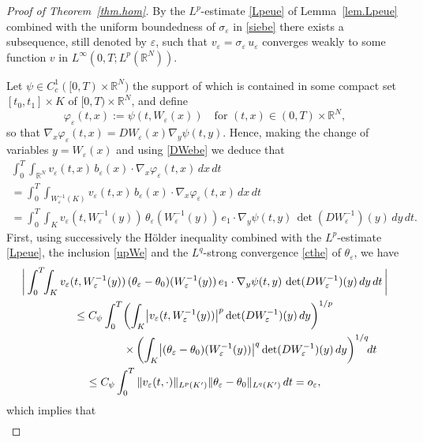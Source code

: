 \documentclass[JEP,XML,SOM,Unicode]{cedram}
\let \ph \varphi
\def \RR {\mathbb R}
\theoremstyle{plain}
\theoremstyle{definition}
\begin{document}
\begin{proof}[Proof of Theorem~\ref{thm.hom}]
By the $L^p$-estimate \eqref{Lpeue} of Lemma~\ref{lem.Lpeue} combined with the uniform boundedness of $\sigma_\varepsilon$ in \eqref{siebe} there exists a subsequence, still denoted by $\varepsilon$, such that $v_\varepsilon=\sigma_\varepsilon\,u_\varepsilon$ converges weakly to some function $v$ in $L^\infty(0,T;L^p(\RR^N))$.

Let $\psi\in C^1_c([0,T)\times\RR^N)$ the support of which is contained in some compact set $[t_0,t_1]\times K$ of $[0,T)\times\RR^N$, and define
\begin{equation}\label{phe}
\ph_\varepsilon(t,x):=\psi(t, W_\varepsilon(x))\quad\mbox{for }(t,x)\in(0,T)\times\RR^N,
\end{equation}
so that $\nabla_x\ph_\varepsilon(t,x)=DW_\varepsilon(x)\nabla_y\psi(t,y)$.
Hence, making the change of variables $y=W_\varepsilon(x)$ and using \eqref{DWebe} we deduce that
\begin{multline}\label{vebe}
\int_0^T\!\!\int_{\RR^N}v_\varepsilon(t,x)\,b_\varepsilon(x)\cdot\nabla_x\ph_\varepsilon(t,x)\,dx\,dt\\
=\int_0^T\!\!\int_{W_\varepsilon^{-1}(K)}v_\varepsilon(t,x)\,b_\varepsilon(x)\cdot\nabla_x\ph_\varepsilon(t,x)\,dx\,dt
\\
=\int_0^T\!\!\int_Kv_\varepsilon(t,W_\varepsilon^{-1}(y))\,\theta_\varepsilon(W_\varepsilon^{-1}(y))\,e_1\cdot\nabla_y\psi(t,y)\,\det(DW_\varepsilon^{-1})(y)\,dy\,dt.
\end{multline}
First, using successively the Hölder inequality combined with the $L^p$-estimate \eqref{Lpeue}, the inclusion \eqref{upWe} and the $L^q$-strong convergence \eqref{cthe} of $\theta_\varepsilon$, we have
\begin{multline*}
\biggl|\,\int_0^T\!\!\int_{K}v_\varepsilon(t,W_\varepsilon^{-1}(y))\,(\theta_\varepsilon-\theta_0)(W_\varepsilon^{-1}(y))\,e_1\cdot\nabla_y\psi(t,y)\,\det(DW_\varepsilon^{-1})(y)\,dy\,dt\,\biggr|
\\
\leq C_\psi \int_0^T\!\left(\int_{K}\!\big|v_\varepsilon(t,W_\varepsilon^{-1}(y))\big|^p\det(DW_\varepsilon^{-1})(y)\,dy\right)^{1/ p}
\\
\shoveright{\times\left(\int_{K}\!\big|(\theta_\varepsilon-\theta_0)(W_\varepsilon^{-1}(y))\big|^q\det(DW_\varepsilon^{-1})(y)\,dy\right)^{1/ q}\!\!dt}
\\
\leq C_\psi\int_0^T\|v_\varepsilon(t,\cdot)\|_{L^p(K')}\|\theta_\varepsilon-\theta_0\|_{L^q(K')}\,dt=o_\varepsilon,
\end{multline*}
which implies that
\begin{multline*}

\end{multline*}
\end{proof}
\end{document}
